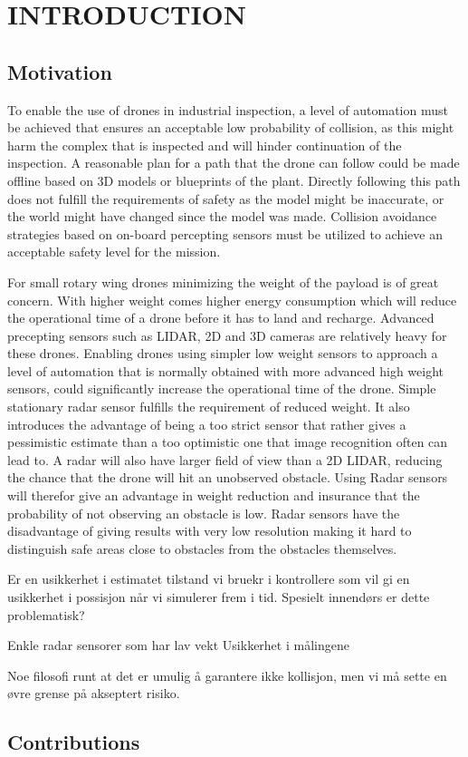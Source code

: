 \section{INTRODUCTION}
\subsection{Motivation}

To enable the use of drones in industrial inspection, a level of automation must be achieved that ensures an acceptable low probability of collision, as this might harm the complex that is inspected and will hinder continuation of the inspection. A reasonable plan for a path that the drone can follow could be made offline based on 3D models or blueprints of the plant. Directly following this path does not fulfill the requirements of safety as the model might be inaccurate, or the world might have changed since the model was made. Collision avoidance strategies based on on-board percepting sensors must be utilized to achieve an acceptable safety level for the mission.

For small rotary wing drones minimizing the weight of the payload is of great concern. With higher weight comes higher energy consumption which will reduce the operational time of a drone before it has to land and recharge. Advanced precepting sensors such as LIDAR, 2D and 3D cameras are relatively heavy for these drones. Enabling drones using simpler low weight sensors to approach a level of automation that is normally obtained with more advanced high weight sensors, could significantly increase the operational time of the drone. Simple stationary radar sensor fulfills the requirement of reduced weight. It also introduces the advantage of being a too strict sensor that rather gives a pessimistic estimate than a too optimistic one that image recognition often can lead to. A radar will also have larger field of view than a 2D LIDAR, reducing the chance that the drone will hit an unobserved obstacle. Using Radar sensors will therefor give an advantage in weight reduction and insurance that the probability of not observing an obstacle is low. Radar sensors have the disadvantage of giving results with very low resolution making it hard to distinguish safe areas close to obstacles from the obstacles themselves. 

Er en usikkerhet i estimatet tilstand vi bruekr i kontrollere som vil gi en usikkerhet i possisjon når vi simulerer frem i tid. 
Spesielt innendørs er dette problematisk?

    Enkle radar sensorer som har lav vekt
    Usikkerhet i målingene 
    
    Noe filosofi runt at det er umulig å garantere ikke kollisjon, men vi må sette en øvre grense på akseptert risiko.


\subsection{Contributions}
